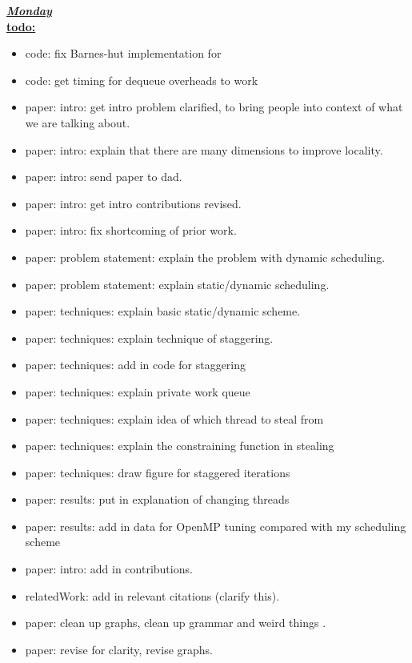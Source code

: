\underline{\textbf{\textit{Monday}}}\\
\underline{\textbf{todo:}}
\begin{itemize}

\item code: fix Barnes-hut implementation for
\item code: get timing for dequeue overheads to work
\item paper: intro: get intro problem clarified, to bring people into context of what we are talking about.
\item paper: intro: explain that there are many dimensions to improve locality.
\item paper: intro: send paper to dad.
\item paper: intro: get intro contributions revised.
\item paper: intro: fix shortcoming of prior work.

\item paper: problem statement: explain the problem with dynamic scheduling.
\item paper: problem statement: explain static/dynamic scheduling.
\item paper: techniques: explain basic static/dynamic scheme.
\item paper: techniques: explain technique of staggering. 
\item paper: techniques: add in code for staggering
\item paper: techniques: explain private work queue
\item paper: techniques: explain idea of which thread to steal from
\item paper: techniques: explain the constraining function in stealing
\item paper: techniques: draw figure for staggered iterations 
\item paper: results: put in explanation of changing threads
\item paper: results: add in data for OpenMP tuning compared with my scheduling scheme
\item paper: intro: add in contributions.
\item relatedWork: add in relevant citations (clarify this).
\item paper: clean up graphs, clean up grammar and weird things .
\item paper: revise for clarity, revise graphs.
\end{itemize}

